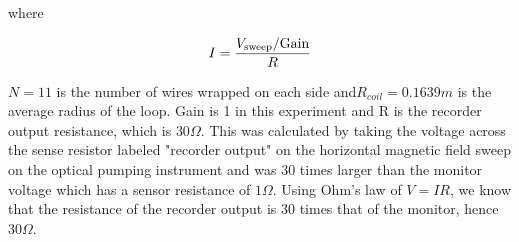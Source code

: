 \documentclass[prb,preprint]{revtex4-1}
\begin{document}
where

\begin{equation}
I=\frac{V_{\textnormal{sweep}}/{\textrm{Gain}}}{R}
\label{vtoi}
\end{equation}


$N=11$ is the number of wires wrapped on each side and$R_{coil}=0.1639m$ is the average radius of the loop. Gain is 1 in this experiment and R is the recorder output resistance, which is $30 \Omega$. This was calculated by taking the voltage across the sense resistor labeled "recorder output" on the horizontal magnetic field sweep on the optical pumping instrument and was 30 times larger than the monitor voltage which has a sensor resistance of $1 \Omega$. Using Ohm's law of $V=IR$, we know that the resistance of the recorder output is 30 times that of the monitor, hence $30 \Omega$.\\
\end{document}
